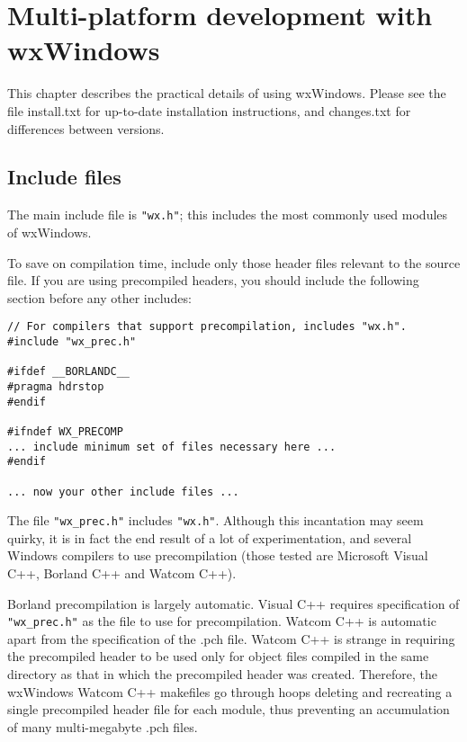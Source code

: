 \chapter{Multi-platform development with wxWindows}\label{multiplat}
%
\setfooter{\thepage}{}{}{}{}{\thepage}%

This chapter describes the practical details of using wxWindows. Please
see the file install.txt for up-to-date installation instructions, and
changes.txt for differences between versions.

\section{Include files}

The main include file is {\tt "wx.h"}; this includes the most commonly
used modules of wxWindows.

To save on compilation time, include only those header files relevant to the
source file. If you are using precompiled headers, you should include
the following section before any other includes:

\begin{verbatim}
// For compilers that support precompilation, includes "wx.h".
#include "wx_prec.h"

#ifdef __BORLANDC__
#pragma hdrstop
#endif

#ifndef WX_PRECOMP
... include minimum set of files necessary here ...
#endif

... now your other include files ...
\end{verbatim}

The file {\tt "wx\_prec.h"} includes {\tt "wx.h"}. Although this incantation
may seem quirky, it is in fact the end result of a lot of experimentation,
and several Windows compilers to use precompilation (those tested are Microsoft Visual C++, Borland C++
and Watcom C++).

Borland precompilation is largely automatic. Visual C++ requires specification of {\tt "wx\_prec.h"} as
the file to use for precompilation. Watcom C++ is automatic apart from the specification of
the .pch file. Watcom C++ is strange in requiring the precompiled header to be used only for
object files compiled in the same directory as that in which the precompiled header was created.
Therefore, the wxWindows Watcom C++ makefiles go through hoops deleting and recreating
a single precompiled header file for each module, thus preventing an accumulation of many
multi-megabyte .pch files.


